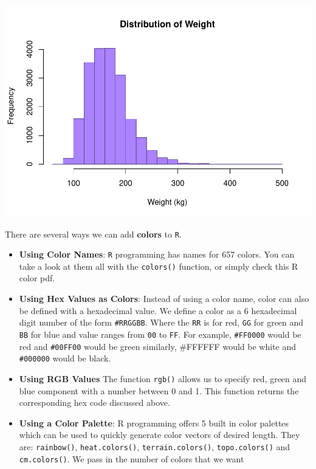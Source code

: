 \documentclass[
]{book}
\begin{document}
\includegraphics{_main_files/figure-latex/unnamed-chunk-173-1.pdf}

There are several ways we can add \textbf{colors} to \texttt{R}.

\begin{itemize}
\item
  \textbf{Using Color Names}: \texttt{R} programming has names for 657 colors. You can take a look at them all with the \texttt{colors()} function, or simply check this R color pdf.
\item
  \textbf{Using Hex Values as Colors}: Instead of using a color name, color can also be defined with a hexadecimal value. We define a color as a 6 hexadecimal digit number of the form \texttt{\#RRGGBB}. Where the \texttt{RR} is for red, \texttt{GG} for green and \texttt{BB} for blue and value ranges from \texttt{00} to \texttt{FF}. For example, \texttt{\#FF0000} would be red and \texttt{\#00FF00} would be green similarly, \#FFFFFF would be white and \texttt{\#000000} would be black.
\item
  \textbf{Using RGB Values} The function \texttt{rgb()} allows us to specify red, green and blue component with a number between 0 and 1. This function returns the corresponding hex code discussed above.
\item
  \textbf{Using a Color Palette}: R programming offers 5 built in color palettes which can be used to quickly generate color vectors of desired length. They are: \texttt{rainbow()}, \texttt{heat.colors()}, \texttt{terrain.colors()}, \texttt{topo.colors()} and \texttt{cm.colors()}. We pass in the number of colors that we want
\end{itemize}
\end{document}
